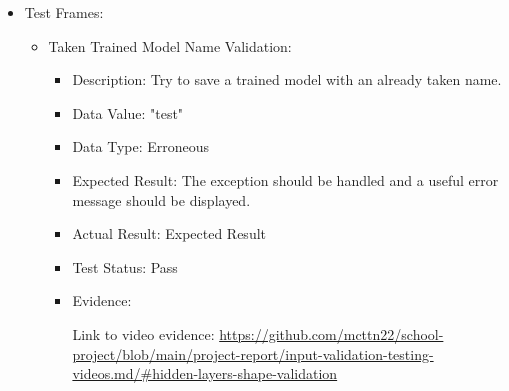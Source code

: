 \documentclass[./project-report/src/latex/project-report.tex]{subfiles}
\begin{document}
\begin{itemize}
    \item Test Frames:
    \label{sec:test-frames-input-validation}
    \begin{itemize}
        \item Taken Trained Model Name Validation:
            \begin{itemize}
                \item Description: Try to save a trained model with an already taken name.
                \item Data Value: "test"
                \item Data Type: Erroneous
                \item Expected Result: The exception should be handled and a useful error message should be displayed.
                \item Actual Result: Expected Result
                \item Test Status: Pass
                \item Evidence:
                    \begin{figure}[h!]
                    \centering
                    \end{figure}

                    Link to video evidence: \url{https://github.com/mcttn22/school-project/blob/main/project-report/input-validation-testing-videos.md/#hidden-layers-shape-validation}
            \end{itemize}

        \pagebreak
        

\end{itemize}
\end{itemize}
\end{document}
